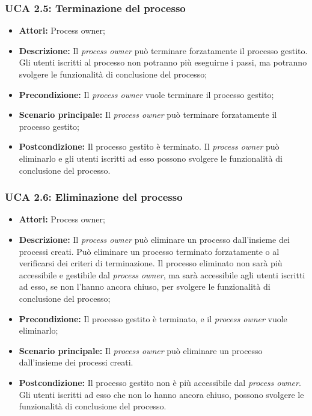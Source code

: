 \hypertarget{A2.5}{}
\subsubsection{UCA 2.5: Terminazione del processo}
\begin{itemize}
\item \textbf{Attori:} Process owner;
\item \textbf{Descrizione:}
Il \textit{process owner} può terminare forzatamente il processo gestito. Gli utenti iscritti al processo non potranno più eseguirne i passi, ma potranno svolgere le funzionalità di conclusione del processo;
\item \textbf{Precondizione:}
Il \textit{process owner} vuole terminare il processo gestito;
\item \textbf{Scenario principale:}
Il \textit{process owner} può terminare forzatamente il processo gestito;
\item \textbf{Postcondizione:}
Il processo gestito è terminato. Il \textit{process owner} può eliminarlo e gli utenti iscritti ad esso possono svolgere le funzionalità di conclusione del processo.
\end{itemize}

\hypertarget{A2.6}{}
\subsubsection{UCA 2.6: Eliminazione del processo}
\begin{itemize}
\item \textbf{Attori:} Process owner;
\item \textbf{Descrizione:}
Il \textit{process owner} può eliminare un processo dall'insieme dei processi creati.
Può eliminare un processo terminato forzatamente o al verificarsi dei criteri di terminazione.
Il processo eliminato non sarà più accessibile e gestibile dal \textit{process owner}, ma sarà accessibile agli utenti iscritti ad esso, se non l'hanno ancora chiuso, per svolgere le funzionalità di conclusione del processo;
\item \textbf{Precondizione:}
Il processo gestito è terminato, e il \textit{process owner} vuole eliminarlo;
\item \textbf{Scenario principale:}
Il \textit{process owner} può eliminare un processo dall'insieme dei processi creati.
\item \textbf{Postcondizione:}
Il processo gestito non è più accessibile dal \textit{process owner}. Gli utenti iscritti ad esso che non lo hanno ancora chiuso, possono svolgere le funzionalità di conclusione del processo.
\end{itemize}

